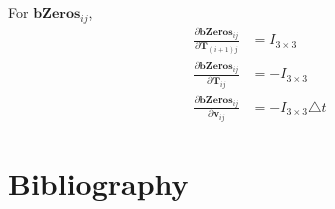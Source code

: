 \documentclass[12pt]{article}   %
\begin{document}
\begin{appendices}
For $\textbf{bZeros}_{ij}$,
\begin{align}
\frac{\partial \textbf{bZeros}_{ij}}{\partial \textbf{T}_{(i+1)j}} &= I_{3\times 3} \\
\frac{\partial \textbf{bZeros}_{ij}}{\partial \textbf{T}_{ij}} &= - I_{3\times 3} \\
\frac{\partial \textbf{bZeros}_{ij}}{\partial \textbf{v}_{ij}} &= - I_{3\times 3} \triangle t  
\end{align}


	
\end{appendices}

\newpage 
\section{Bibliography}
\label{Bibliography}



\end{document}
